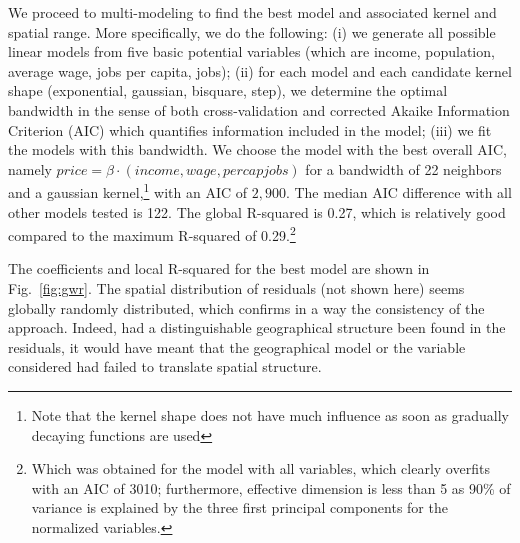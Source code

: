 \documentclass[10pt]{article}
\begin{document}
We proceed to multi-modeling to find the best model and associated kernel and spatial range. More specifically, we do the following: (i) we generate all possible linear models from five basic potential variables (which are income, population, average wage, jobs per capita, jobs); (ii) for each model and each candidate kernel shape (exponential, gaussian, bisquare, step), we determine the optimal bandwidth in the sense of both cross-validation and corrected Akaike Information Criterion (AIC) which quantifies information included in the model; (iii) we fit the models with this bandwidth. We choose the model with the best overall AIC, namely $price = \beta\cdot\left( income, wage, percapjobs\right)$ for a bandwidth of 22 neighbors and a gaussian kernel,\footnote{Note that the kernel shape does not have much influence as soon as gradually decaying functions are used} with an AIC of $2,900$. The median AIC difference with all other models tested is 122. The global R-squared is 0.27, which is relatively good compared to the maximum R-squared of 0.29.\footnote{Which was obtained for the model with all variables, which clearly overfits with an AIC of 3010; furthermore, effective dimension is less than 5 as 90\% of variance is explained by the three first principal components for the normalized variables.}

The coefficients and local R-squared for the best model are shown in Fig.~\ref{fig:gwr}. The spatial distribution of residuals (not shown here) seems globally randomly distributed, which confirms in a way the consistency of the approach. Indeed, had a distinguishable geographical structure been found in the residuals, it would have meant that the geographical model or the variable considered had failed to translate spatial structure.
\end{document}
